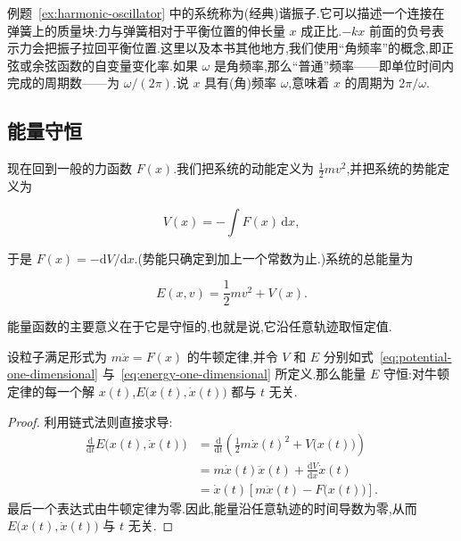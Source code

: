 例题~\ref{ex:harmonic-oscillator} 中的系统称为(经典)谐振子.它可以描述一个连接在弹簧上的质量块:力与弹簧相对于平衡位置的伸长量 $x$ 成正比.$-kx$ 前面的负号表示力会把振子拉回平衡位置.这里以及本书其他地方,我们使用“角频率”的概念,即正弦或余弦函数的自变量变化率.如果 $\omega$ 是角频率,那么“普通”频率——即单位时间内完成的周期数——为 $\omega/(2\pi)$.说 $x$ 具有(角)频率 $\omega$,意味着 $x$ 的周期为 $2\pi/\omega$.

\subsection{能量守恒}

现在回到一般的力函数 $F(x)$.我们把系统的动能定义为 $\frac12mv^{2}$,并把系统的势能定义为

\begin{equation}
  V(x)=-\int F(x)\,\mathrm{d}x,
  \label{eq:potential-one-dimensional}
\end{equation}

于是 $F(x)=-\mathrm{d}V/\mathrm{d}x$.(势能只确定到加上一个常数为止.)系统的总能量为

\begin{equation}
  E(x,v)=\frac12mv^{2}+V(x).
  \label{eq:energy-one-dimensional}
\end{equation}

能量函数的主要意义在于它是守恒的,也就是说,它沿任意轨迹取恒定值.

\begin{theorem}[能量守恒]\label{thm:one-dimensional-energy}
设粒子满足形式为 $m\ddot{x}=F(x)$ 的牛顿定律,并令 $V$ 和 $E$ 分别如式~\eqref{eq:potential-one-dimensional} 与~\eqref{eq:energy-one-dimensional} 所定义.那么能量 $E$ 守恒:对牛顿定律的每一个解 $x(t)$,$E\bigl(x(t),\dot{x}(t)\bigr)$ 都与 $t$ 无关.
\end{theorem}

\begin{proof}
利用链式法则直接求导:
\begin{align*}
\frac{\mathrm{d}}{\mathrm{d}t}E\bigl(x(t),\dot{x}(t)\bigr)
 &=\frac{\mathrm{d}}{\mathrm{d}t}\left(\frac12m\dot{x}(t)^{2}+V\bigl(x(t)\bigr)\right)\\
 &=m\dot{x}(t)\ddot{x}(t)+\frac{\mathrm{d}V}{\mathrm{d}x}\dot{x}(t)\\
 &=\dot{x}(t)\left[m\ddot{x}(t)-F\bigl(x(t)\bigr)\right].
\end{align*}
最后一个表达式由牛顿定律为零.因此,能量沿任意轨迹的时间导数为零,从而 $E\bigl(x(t),\dot{x}(t)\bigr)$ 与 $t$ 无关.
\end{proof}

